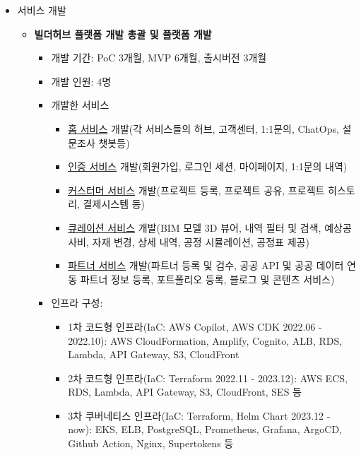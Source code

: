 \begin{itemize}[label=]
\begin{itemize}[label=]
	\item 서비스 개발
	      \begin{itemize}[label=]
		      \item \textbf{빌더허브 플랫폼 개발 총괄 및 플랫폼 개발} \hyperref[bhplf]{\space {}}
		            \begin{itemize}[label=]
			            \item 개발 기간: PoC 3개월, MVP 6개월, 출시버전 3개월
			            \item 개발 인원: 4명
			            \item 개발한 서비스
			                  \begin{itemize}
				                  \item \href{https://builderhub.io}{홈 서비스} 개발(각 서비스들의 허브, 고객센터, 1:1문의, ChatOps, 설문조사 챗봇등)
				                  \item \href{https://auth.builderhub.io}{인증 서비스} 개발(회원가입, 로그인 세션, 마이페이지, 1:1문의 내역)
				                  \item \href{https://app.builderhub.io}{커스터머 서비스} 개발(프로젝트 등록, 프로젝트 공유, 프로젝트 히스토리, 결제시스템 등)
				                  \item \href{https://curation.builderhub.io/project/tester}{큐레이션 서비스} 개발(BIM 모델 3D 뷰어, 내역 필터 및 검색, 예상공사비, 자재 변경, 상세 내역, 공정 시뮬레이션, 공정표 제공)
				                  \item \href{https://partners.builderhub.io/}{파트너 서비스} 개발(파트너 등록 및 검수, 공공 API 및 공공 데이터 연동 파트너 정보 등록, 포트폴리오 등록, 블로그 및 콘텐츠 서비스)
			                  \end{itemize}
			            \item 인프라 구성:
			                  \begin{itemize}
				                  \item 1차 코드형 인프라(IaC: AWS Copilot, AWS CDK 2022.06 - 2022.10): AWS CloudFormation, Amplify, Cognito, ALB, RDS, Lambda, API Gateway, S3, CloudFront
				                  \item 2차 코드형 인프라(IaC: Terraform 2022.11 - 2023.12): AWS ECS, RDS, Lambda, API Gateway, S3, CloudFront, SES 등
				                  \item 3차 쿠버네티스 인프라(IaC: Terraform, Helm Chart 2023.12 - now): EKS, ELB, PostgreSQL, Prometheus, Grafana, ArgoCD, Github Action, Nginx, Supertokens 등

\end{itemize}
\end{itemize}
\end{itemize}
\end{itemize}
\end{itemize}
